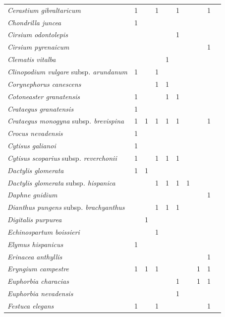 {\begin{longtable}{llllllllll}
\textit{Cerastium gibraltaricum}  & 1 &  & 1 &  & 1 &  &  & 1 \\
\textit{Chondrilla juncea}  & 1 &  &  &  &  &  &  &  \\
\textit{Cirsium odontolepis}  &  &  &  &  & 1 &  &  &  \\
\textit{Cirsium pyrenaicum}  &  &  &  &  &  &  &  & 1 \\
\textit{Clematis vitalba}  &  &  &  & 1 &  &  &  &  \\
\textit{Clinopodium vulgare }subsp\textit{. arundanum}  & 1 &  & 1 &  &  &  &  &  \\
\textit{Corynephorus canescens}  &  &  & 1 & 1 &  &  &  &  \\
\textit{Cotoneaster granatensis}  & 1 &  &  & 1 & 1 &  &  &  \\
\textit{Crataegus granatensis}  & 1 &  &  &  &  &  &  &  \\
\textit{Crataegus monogyna }subsp\textit{. brevispina}  & 1 & 1 & 1 & 1 & 1 &  &  & 1 \\
\textit{Crocus nevadensis}  & 1 &  &  &  &  &  &  &  \\
\textit{Cytisus galianoi}  & 1 &  &  &  &  &  &  &  \\
\textit{Cytisus scoparius }subsp\textit{. reverchonii}  & 1 &  & 1 & 1 & 1 &  &  &  \\
\textit{Dactylis glomerata}  & 1 & 1 &  &  &  &  &  &  \\
\textit{Dactylis glomerata }subsp\textit{. hispanica}  &  &  & 1 & 1 & 1 & 1 &  &  \\
\textit{Daphne gnidium}  &  &  &  &  &  &  &  & 1 \\
\textit{Dianthus pungens }subsp\textit{. brachyanthus}  &  &  & 1 & 1 & 1 &  &  &  \\
\textit{Digitalis purpurea}  &  & 1 &  &  &  &  &  &  \\
\textit{Echinospartum boissieri}  &  &  & 1 &  &  &  &  &  \\
\textit{Elymus hispanicus}  & 1 &  &  &  &  &  &  &  \\
\textit{Erinacea anthyllis}  &  &  &  &  &  &  &  & 1 \\
\textit{Eryngium campestre}  & 1 & 1 & 1 &  &  &  & 1 & 1 \\
\textit{Euphorbia characias}  &  &  &  &  & 1 &  & 1 & 1 \\
\textit{Euphorbia nevadensis}  &  &  &  &  & 1 &  &  &  \\
\textit{Festuca elegans}  & 1 &  & 1 &  &  &  &  & 1 \\

\end{longtable}}
